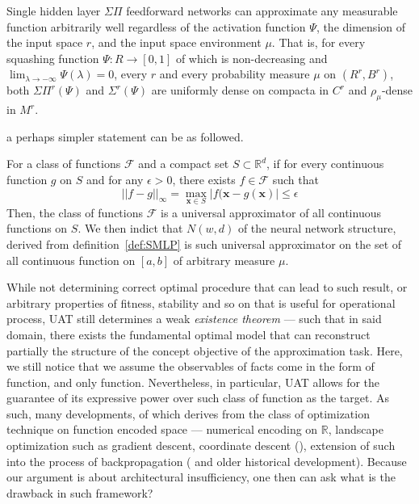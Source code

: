 \begin{theorem}
    Single hidden layer $\Sigma\Pi$ feedforward networks can approximate any measurable function arbitrarily well regardless of the activation function $\Psi$, the dimension of the input space $r$, and the input space environment $\mu$. That is, for every squashing function $\Psi:R\to[0,1]$ of which is non-decreasing and $\lim_{\lambda\to-\infty}\Psi(\lambda)=0$, every $r$ and every probability measure $\mu$ on $(R^{r},B^{r})$, both $\Sigma\Pi^{r}(\Psi)$ and $\Sigma^{r}(\Psi)$ are uniformly dense on compacta in $C^{r}$ and $\rho_{\mu}$-dense in $M^{r}$. 
\end{theorem}

a perhaps simpler statement can be as followed. 

\begin{theorem}
    For a class of functions $\mathcal{F}$ and a compact set $S\subset \mathbb{R}^{d}$, if for every continuous function $g$ on $S$ and for any $\epsilon>0$, there exists $f\in \mathcal{F}$ such that \begin{equation}
        ||f-g||_{\infty} = \max_{\mathbf{x}\in S} |f(\mathbf{x}-g(\mathbf{x})| \leq \epsilon
    \end{equation}
    Then, the class of functions $\mathcal{F}$ is a universal approximator of all continuous functions on $S$. We then indict that $N(w,d)$  of the neural network structure, derived from definition~\ref{def:SMLP} is such universal approximator on the set of all continuous function on $[a,b]$ of arbitrary measure $\mu$. 
\end{theorem}

While not determining correct optimal procedure that can lead to such result, or arbitrary properties of fitness, stability and so on that is useful for operational process, UAT still determines a weak \textit{existence theorem} --- such that in said domain, there exists the fundamental optimal model that can reconstruct partially the structure of the concept objective of the approximation task. Here, we still notice that we assume the observables of facts come in the form of function, and only function. Nevertheless, in particular, UAT allows for the guarantee of its expressive power over such class of function as the target. As such, many developments, of which derives from the class of optimization technique on function encoded space --- numerical encoding on $\mathbb{R}$, landscape optimization such as gradient descent, coordinate descent (\cite{luo1992convergence,tseng2001convergence,friedman2007pathwise,wright2015coordinate,tseng2009coordinate}), extension of such into the process of backpropagation (\cite{rumelhart1986learning} and older historical development). Because our argument is about architectural insufficiency, one then can ask what is the drawback in such framework? 

